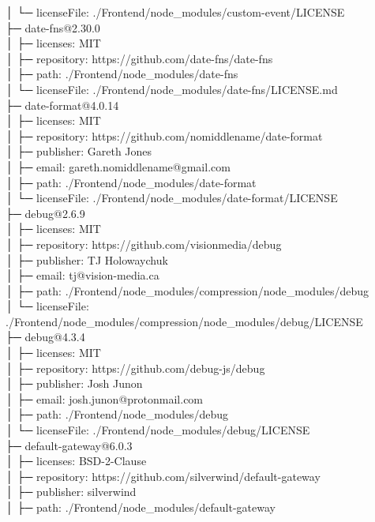 │  └─ licenseFile: ./Frontend/node\_modules/custom-event/LICENSE\\
├─ date-fns@2.30.0\\
│  ├─ licenses: MIT\\
│  ├─ repository: https://github.com/date-fns/date-fns\\
│  ├─ path: ./Frontend/node\_modules/date-fns\\
│  └─ licenseFile: ./Frontend/node\_modules/date-fns/LICENSE.md\\
├─ date-format@4.0.14\\
│  ├─ licenses: MIT\\
│  ├─ repository: https://github.com/nomiddlename/date-format\\
│  ├─ publisher: Gareth Jones\\
│  ├─ email: gareth.nomiddlename@gmail.com\\
│  ├─ path: ./Frontend/node\_modules/date-format\\
│  └─ licenseFile: ./Frontend/node\_modules/date-format/LICENSE\\
├─ debug@2.6.9\\
│  ├─ licenses: MIT\\
│  ├─ repository: https://github.com/visionmedia/debug\\
│  ├─ publisher: TJ Holowaychuk\\
│  ├─ email: tj@vision-media.ca\\
│  ├─ path: ./Frontend/node\_modules/compression/node\_modules/debug\\
│  └─ licenseFile: ./Frontend/node\_modules/compression/node\_modules/debug/LICENSE\\
├─ debug@4.3.4\\
│  ├─ licenses: MIT\\
│  ├─ repository: https://github.com/debug-js/debug\\
│  ├─ publisher: Josh Junon\\
│  ├─ email: josh.junon@protonmail.com\\
│  ├─ path: ./Frontend/node\_modules/debug\\
│  └─ licenseFile: ./Frontend/node\_modules/debug/LICENSE\\
├─ default-gateway@6.0.3\\
│  ├─ licenses: BSD-2-Clause\\
│  ├─ repository: https://github.com/silverwind/default-gateway\\
│  ├─ publisher: silverwind\\
│  ├─ path: ./Frontend/node\_modules/default-gateway\\

